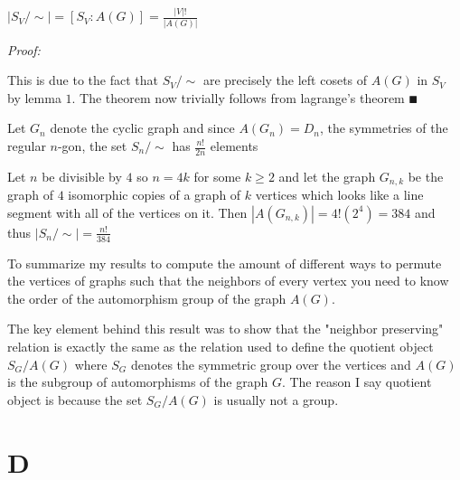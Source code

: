 \documentclass[paper=a4,fontsize=paper,12.5pt]{book}
\newcommand{\3}{\vspace*{3mm}}
\newcommand{\Proof}{\textit{Proof:}}
\begin{document}
\begin{theorem}

$|{S}_{V}/\sim| = [{S}_{V} : A(G) ] = \frac{|V|!}{|A(G)|}$


\end{theorem}

\Proof

This is due to the fact that ${S}_{V}/\sim $ are precisely the left cosets of $A(G)$ in ${S}_{V}$ by lemma $1$. The theorem now trivially follows from lagrange's theorem $\QED$


\3

\begin{corollary}

Let ${G}_{n}$ denote the cyclic graph and since $A({G}_{n}) = {D}_{n}$, the symmetries of the regular $n$-gon, the set ${S}_{n}/\sim$ has $\frac{n!}{2n}$ elements


\end{corollary}

\3

\begin{corollary}

Let $n$ be divisible by $4$ so $n = 4k$ for some $k \geq 2$ and let the graph ${G}_{n,k}$ be the graph of $4$ isomorphic copies of a graph of $k$ vertices which looks like a line segment with all of the vertices on it. Then $|A({G}_{n,k})| = 4!({2}^{4}) = 384$ and thus $|{S}_{n}/\sim| =\frac{n!}{384}$



\end{corollary}

\3

To summarize my results to compute the amount of different ways to permute the vertices of graphs such that the neighbors of every vertex you need to know the order of the automorphism group of the graph $A(G)$.

\3

The key element behind this result was to show that the "neighbor preserving" relation is exactly the same as the relation used to define the quotient object ${S}_{G}/A(G)$ where ${S}_{G}$ denotes the symmetric group over the vertices and $A(G)$ is the subgroup of automorphisms of the graph $G$. The reason I say quotient object is because the set ${S}_{G}/A(G)$ is usually not a group. 

\section*{D}
\end{document}

